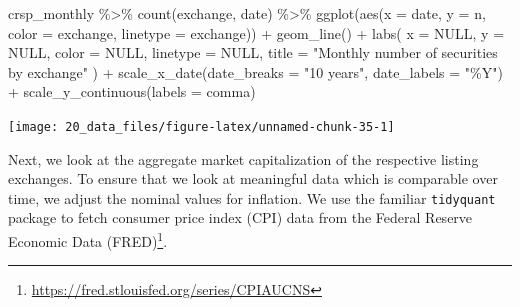 \documentclass[
]{krantz}
\newenvironment{Shaded}{\begin{snugshade}}{\end{snugshade}}
\newcommand{\AttributeTok}[1]{\textcolor[rgb]{0.61,0.61,0.61}{#1}}
\newcommand{\ConstantTok}[1]{\textcolor[rgb]{0,0,0}{#1}}
\newcommand{\FunctionTok}[1]{\textcolor[rgb]{0,0,0}{#1}}
\newcommand{\NormalTok}[1]{#1}
\newcommand{\OtherTok}[1]{\textcolor[rgb]{0.37,0.37,0.37}{#1}}
\newcommand{\SpecialCharTok}[1]{\textcolor[rgb]{0,0,0}{#1}}
\newcommand{\StringTok}[1]{\textcolor[rgb]{0.5,0.5,0.5}{#1}}
\renewcommand{\href}[2]{#2\footnote{\url{#1}}}
\begin{document}
\begin{Shaded}
\begin{Highlighting}[]
\NormalTok{crsp\_monthly }\SpecialCharTok{\%\textgreater{}\%}
  \FunctionTok{count}\NormalTok{(exchange, date) }\SpecialCharTok{\%\textgreater{}\%}
  \FunctionTok{ggplot}\NormalTok{(}\FunctionTok{aes}\NormalTok{(}\AttributeTok{x =}\NormalTok{ date, }\AttributeTok{y =}\NormalTok{ n, }\AttributeTok{color =}\NormalTok{ exchange, }\AttributeTok{linetype =}\NormalTok{ exchange)) }\SpecialCharTok{+}
  \FunctionTok{geom\_line}\NormalTok{() }\SpecialCharTok{+}
  \FunctionTok{labs}\NormalTok{(}
    \AttributeTok{x =} \ConstantTok{NULL}\NormalTok{, }\AttributeTok{y =} \ConstantTok{NULL}\NormalTok{, }\AttributeTok{color =} \ConstantTok{NULL}\NormalTok{, }\AttributeTok{linetype =} \ConstantTok{NULL}\NormalTok{,}
    \AttributeTok{title =} \StringTok{"Monthly number of securities by exchange"}
\NormalTok{  ) }\SpecialCharTok{+}
  \FunctionTok{scale\_x\_date}\NormalTok{(}\AttributeTok{date\_breaks =} \StringTok{"10 years"}\NormalTok{, }\AttributeTok{date\_labels =} \StringTok{"\%Y"}\NormalTok{) }\SpecialCharTok{+}
  \FunctionTok{scale\_y\_continuous}\NormalTok{(}\AttributeTok{labels =}\NormalTok{ comma)}
\end{Highlighting}
\end{Shaded}

\begin{center}\texttt{[image: 20\_data\_files/figure-latex/unnamed-chunk-35-1]} \end{center}

Next, we look at the aggregate market capitalization of the respective listing exchanges. To ensure that we look at meaningful data which is comparable over time, we adjust the nominal values for inflation. We use the familiar \texttt{tidyquant} package to fetch consumer price index (CPI) data from the \href{https://fred.stlouisfed.org/series/CPIAUCNS}{Federal Reserve Economic Data (FRED)}.

\begin{Shaded}
\end{Shaded}
\end{document}
